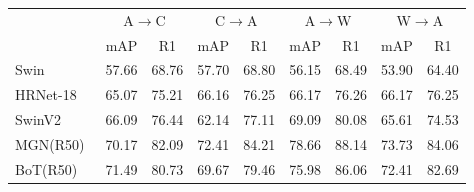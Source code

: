 \documentclass[runningheads]{llncs}
\makeatletter
\let\leaderboards@table\table
\let\leaderboards@endtable\endtable
\renewenvironment{table}[1][]{\leaderboards@table[H]}{\leaderboards@endtable}
\makeatother
\begin{document}
\begin{table}[t]
  \caption{\textbf{Performance comparison on AG-ReID v2.}
    Best results are in \textbf{bold}.}
  \label{tab:sota_agreidv2}
  \centering
  \begin{tabular}{lcccccccc}
    \Xhline{1.0pt}
    \multirow{2}{*}{Method}
                                       & \multicolumn{2}{c}{A$\rightarrow$C}
                                       & \multicolumn{2}{c}{C$\rightarrow$A}
                                       & \multicolumn{2}{c}{A$\rightarrow$W}
                                       & \multicolumn{2}{c}{W$\rightarrow$A}                                                                                                                                                                                   \\
    \cmidrule(lr){2-3}\cmidrule(lr){4-5}\cmidrule(lr){6-7}\cmidrule(lr){8-9}
                                       & \multicolumn{1}{c}{mAP}             & \multicolumn{1}{c}{R1} & \multicolumn{1}{c}{mAP} & \multicolumn{1}{c}{R1} & \multicolumn{1}{c}{mAP} & \multicolumn{1}{c}{R1} & \multicolumn{1}{c}{mAP} & \multicolumn{1}{c}{R1} \\
    \Xhline{0.6pt}
    Swin~\cite{liu2021swin}            & 57.66                               & 68.76                  & 57.70                   & 68.80                  & 56.15                   & 68.49                  & 53.90                   & 64.40                  \\
    HRNet-18~\cite{wang2020deep}       & 65.07                               & 75.21                  & 66.16                   & 76.25                  & 66.17                   & 76.26                  & 66.17                   & 76.25                  \\
    SwinV2~\cite{liu2022swin}          & 66.09                               & 76.44                  & 62.14                   & 77.11                  & 69.09                   & 80.08                  & 65.61                   & 74.53                  \\
    MGN(R50)~\cite{wang2018learning}   & 70.17                               & 82.09                  & 72.41                   & 84.21                  & 78.66                   & 88.14                  & 73.73                   & 84.06                  \\
    BoT(R50)~\cite{luo2019bag}         & 71.49                               & 80.73                  & 69.67                   & 79.46                  & 75.98                   & 86.06                  & 72.41                   & 82.69                  \\

\end{tabular}
\end{table}
\end{document}
